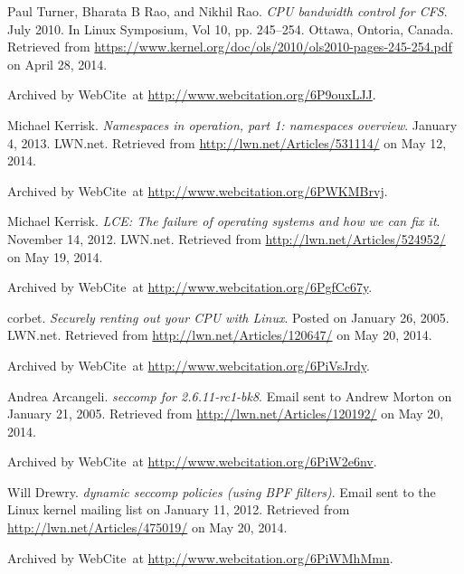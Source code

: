 \begin{thebibliography}{9}
Paul Turner, Bharata B Rao, and Nikhil Rao. \emph{CPU bandwidth control for
CFS}. July 2010. In Linux Symposium, Vol 10, pp. 245--254. Ottawa, Ontoria,
Canada. Retrieved from
\url{https://www.kernel.org/doc/ols/2010/ols2010-pages-245-254.pdf} on April
28, 2014.

Archived by WebCite\textsuperscript{\textregistered}\ at
\url{http://www.webcitation.org/6P9ouxLJJ}.


Michael Kerrisk. \emph{Namespaces in operation, part 1: namespaces overview}.
January 4, 2013. LWN.net. Retrieved from \url{http://lwn.net/Articles/531114/}
on May 12, 2014.

Archived by WebCite\textsuperscript{\textregistered}\ at
\url{http://www.webcitation.org/6PWKMBrvj}.


Michael Kerrisk. \emph{LCE: The failure of operating systems and how we can fix
it}. November 14, 2012. LWN.net. Retrieved from
\url{http://lwn.net/Articles/524952/} on May 19, 2014.

Archived by WebCite\textsuperscript{\textregistered}\ at
\url{http://www.webcitation.org/6PgfCc67y}.


corbet. \emph{Securely renting out your CPU with Linux}. Posted on January 26,
2005. LWN.net. Retrieved from \url{http://lwn.net/Articles/120647/} on May 20,
2014.

Archived by WebCite\textsuperscript{\textregistered}\ at
\url{http://www.webcitation.org/6PiVsJrdy}.


Andrea Arcangeli. \emph{seccomp for 2.6.11-rc1-bk8}. Email sent to Andrew
Morton on January 21, 2005. Retrieved from
\url{http://lwn.net/Articles/120192/} on May 20, 2014.

Archived by WebCite\textsuperscript{\textregistered}\ at
\url{http://www.webcitation.org/6PiW2e6nv}.


Will Drewry. \emph{dynamic seccomp policies (using BPF filters)}. Email sent to
the Linux kernel mailing list on January 11, 2012. Retrieved from
\url{http://lwn.net/Articles/475019/} on May 20, 2014.

Archived by WebCite\textsuperscript{\textregistered}\ at
\url{http://www.webcitation.org/6PiWMhMmn}.


\end{thebibliography}

